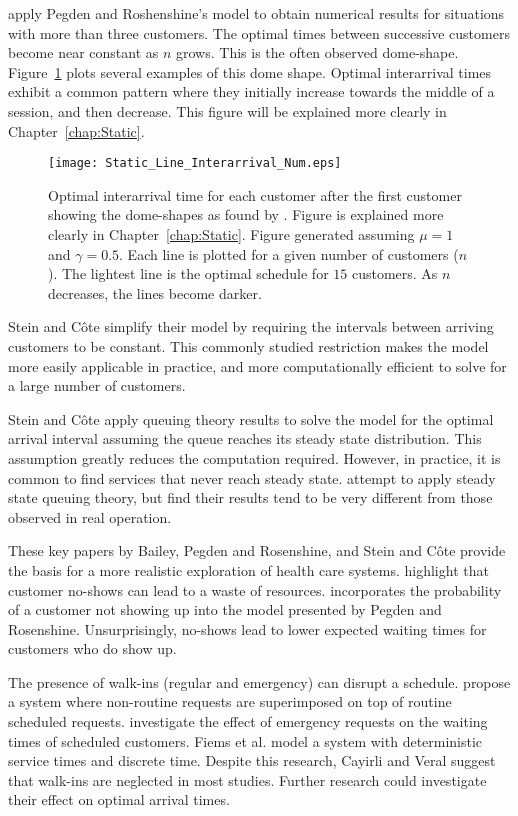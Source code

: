 \citet{Stein} apply Pegden and Roshenshine's model to obtain numerical results for situations with more than three customers. The optimal times between successive customers become near constant as $n$ grows. This is the often observed dome-shape. Figure~\ref{fig:Lit_Dome_Shape} plots several examples of this dome shape. Optimal interarrival times exhibit a common pattern where they initially increase towards the middle of a session, and then decrease. This figure will be explained more clearly in Chapter~\ref{chap:Static}.
\begin{figure}[htb]
	\centering
	\texttt{[image: Static\_Line\_Interarrival\_Num.eps]}
	\caption{Optimal interarrival time for each customer after the first customer showing the dome-shapes as found by \citet{Stein}. Figure is explained more clearly in Chapter~\ref{chap:Static}. Figure generated assuming $\mu = 1$ and $\gamma = 0.5$. Each line is plotted for a given number of customers ($n$). The lightest line is the optimal schedule for $15$ customers. As $n$ decreases, the lines become darker.}
	\label{fig:Lit_Dome_Shape}
\end{figure}

Stein and C\^{o}te simplify their model by requiring the intervals between arriving customers to be constant. This commonly studied restriction makes the model more easily applicable in practice, and more computationally efficient to solve for a large number of customers.

Stein and C\^{o}te apply queuing theory results to solve the model for the optimal arrival interval assuming the queue reaches its steady state distribution. This assumption greatly reduces the computation required. However, in practice, it is common to find services that never reach steady state. \citet{Babes} attempt to apply steady state queuing theory, but find their results tend to be very different from those observed in real operation.

These key papers by Bailey, Pegden and Rosenshine, and Stein and C\^{o}te provide the basis for a more realistic exploration of health care systems. \citet{Delaurentis} highlight that customer no-shows can lead to a waste of resources. \citet{Mendel} incorporates the probability of a customer not showing up into the model presented by Pegden and Rosenshine. Unsurprisingly, no-shows lead to lower expected waiting times for customers who do show up.

The presence of walk-ins (regular and emergency) can disrupt a schedule. \citet{Gupta} propose a system where non-routine requests are superimposed on top of routine scheduled requests. \citet{Fiems} investigate the effect of emergency requests on the waiting times of scheduled customers. Fiems et al. model a system with deterministic service times and discrete time. Despite this research, Cayirli and Veral suggest that walk-ins are neglected in most studies. Further research could investigate their effect on optimal arrival times.

